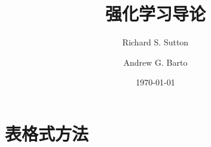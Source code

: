 \documentclass[cs4size, twoside, fancyhdr, fleqn, openany, hyperref]{ctexbook}
\title{强化学习导论}
\author{Richard S. Sutton \and Andrew G. Barto}
\date{\today}
\begin{document}
\frontmatter
\pagestyle{empty}

\begin{titlepage}

\cleardoublepage
\end{titlepage}

\tableofcontents
\cleardoublepage

\pagestyle{fancy}



\mainmatter

\part{表格式方法}\label{part:1}



\printbibliography[title={参考文献}]
\end{document}
